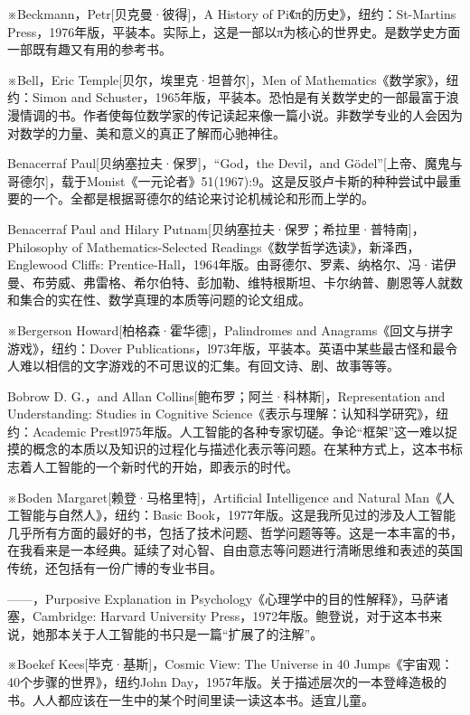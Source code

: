 \documentclass[
  12pt,
  twoside,
  openright,
  oldfontcommands,
]{memoir}
\begin{document}
※Beckmann，Petr{[}贝克曼·彼得{]}，A History of Pi《π的历史》，纽约：St-Martin\textquotesingle s Press，1976年版，平装本。实际上，这是一部以π为核心的世界史。是数学史方面一部既有趣又有用的参考书。

※Bell，Eric Temple{[}贝尔，埃里克·坦普尔{]}，Men of Mathematics《数学家》，纽约：Simon and Schuster，1965年版，平装本。恐怕是有关数学史的一部最富于浪漫情调的书。作者使每位数学家的传记读起来像一篇小说。非数学专业的人会因为对数学的力量、美和意义的真正了解而心驰神往。

Benacerraf Paul{[}贝纳塞拉夫·保罗{]}，``God，the Devil，and Gödel''{[}上帝、魔鬼与哥德尔{]}，载于Monist《一元论者》51(1967):9。这是反驳卢卡斯的种种尝试中最重要的一个。全都是根据哥德尔的结论来讨论机械论和形而上学的。

Benacerraf Paul and Hilary Putnam{[}贝纳塞拉夫·保罗；希拉里·普特南{]}，Philosophy of Mathematics-Selected Readings《数学哲学选读》，新泽西，Englewood Cliffs: Prentice-Hall，1964年版。由哥德尔、罗素、纳格尔、冯·诺伊曼、布劳威、弗雷格、希尔伯特、彭加勒、维特根斯坦、卡尔纳普、蒯恩等人就数和集合的实在性、数学真理的本质等问题的论文组成。

※Bergerson Howard{[}柏格森·霍华德{]}，Palindromes and Anagrams《回文与拼字游戏》，纽约：Dover Publications，l973年版，平装本。英语中某些最古怪和最令人难以相信的文字游戏的不可思议的汇集。有回文诗、剧、故事等等。

Bobrow D. G.，and Allan Collins{[}鲍布罗；阿兰·科林斯{]}，Representation and Understanding: Studies in Cognitive Science《表示与理解：认知科学研究》，纽约：Academic Prestl975年版。人工智能的各种专家切磋。争论``框架''这一难以捉摸的概念的本质以及知识的过程化与描述化表示等问题。在某种方式上，这本书标志着人工智能的一个新时代的开始，即表示的时代。

※Boden Margaret{[}赖登·马格里特{]}，Artificial Intelligence and Natural Man《人工智能与自然人》，纽约：Basic Book，1977年版。这是我所见过的涉及人工智能几乎所有方面的最好的书，包括了技术问题、哲学问题等等。这是一本丰富的书，在我看来是一本经典。延续了对心智、自由意志等问题进行清晰思维和表述的英国传统，还包括有一份广博的专业书目。

------，Purposive Explanation in Psychology《心理学中的目的性解释》，马萨诸塞，Cambridge: Harvard University Press，1972年版。鲍登说，对于这本书来说，她那本关于人工智能的书只是一篇``扩展了的注解''。

※Boekef Kees{[}毕克·基斯{]}，Cosmic View: The Universe in 40 Jumps《宇宙观：40个步骤的世界》，纽约John Day，1957年版。关于描述层次的一本登峰造极的书。人人都应该在一生中的某个时间里读一读这本书。适宜儿童。
\end{document}
